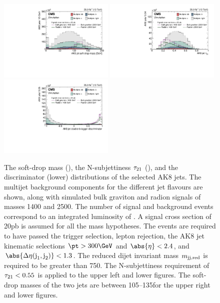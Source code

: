 \begin{figure}[htbp]
\centering
\includegraphics[width=0.49\textwidth]{B2G-16-026/Figure_001-a.pdf}
\includegraphics[width=0.49\textwidth]{B2G-16-026/Figure_001-b.pdf}
\includegraphics[width=0.49\textwidth]{B2G-16-026/Figure_001-c.pdf}
\caption{The soft-drop mass (\cmsLeftU), the N-subjettiness $\tau_{21}$
  (\cmsRightU), and the \Hbbt discriminator (lower) distributions of the selected AK8
  jets. The multijet background components for the different jet
  flavours are shown, along with simulated bulk graviton and radion signals of
  masses 1400 and 2500\GeV. The number of signal and background
  events correspond to an integrated luminosity of \intLumi. A signal
  cross section of 20\unit{pb} is assumed for all the mass
  hypotheses. The events are required to have passed the trigger
  selection, lepton rejection, the AK8 jet kinematic selections $\pt >
  300\GeV$ and $\abs{\eta} < 2.4$, and $\abs{\DeltaEta} < 1.3$. The reduced dijet
  invariant mass $m_{\text{jj,red}}$ is required to be greater than 750\GeV. The
  N-subjettiness requirement of $\tau_{21} < 0.55$ is applied to the upper
  left and lower figures. The soft-drop masses of the two jets
  are between 105--135\GeV for the upper right and lower
  figures.\label{fig:uncorrsd_prebtag}}
\end{figure}

